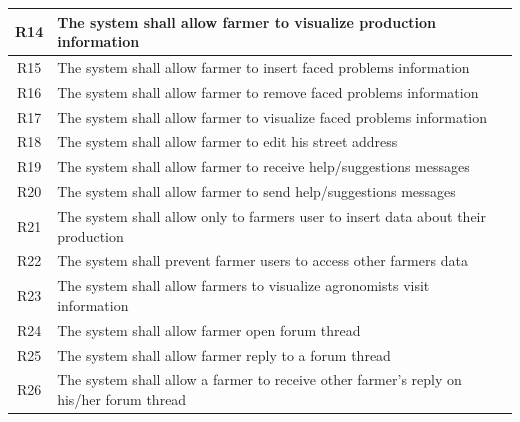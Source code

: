 \begin{center}
\begin{longtable}{|c|m{}|}
            \textsc{R14}  &    The system shall allow farmer to visualize production information  \\
            \hline
            \textsc{R15}  &    The system shall allow farmer to insert faced problems information  \\
            \textsc{R16}  &    The system shall allow farmer to remove faced problems information  \\
            \textsc{R17}  &    The system shall allow farmer to visualize faced problems information  \\
            \hline
            \textsc{R18}  &    The system shall allow farmer to edit his street address  \\
            \hline
            \textsc{R19}  &    The system shall allow farmer to receive help/suggestions messages \\
            \textsc{R20}  &    The system shall allow farmer to send help/suggestions messages \\
            \hline
            \textsc{R21}  &    The system shall allow only to farmers user to insert data about their production  \\
            \hline
            \textsc{R22}  &    The system shall prevent farmer users to access other farmers data  \\
            \hline
            \textsc{R23}  &    The system shall allow farmers to visualize agronomists visit information  \\
            \hline
            \textsc{R24}  &    The system shall allow farmer open forum thread  \\
            \hline
            \textsc{R25}  &    The system shall allow farmer reply to a forum thread  \\
            \hline
            \textsc{R26}  &    The system shall allow a farmer to receive other farmer's reply on his/her forum thread  \\
            \hline
            \hline
            \hline
            

\end{longtable}
\end{center}
